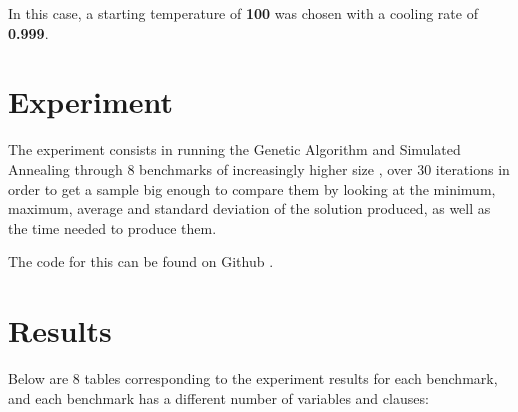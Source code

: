 \documentclass{article}
\begin{document}
In this case, a starting temperature of \textbf{100} was chosen with a
cooling rate of \textbf{0.999}.

\section{Experiment}
The experiment consists in running the Genetic Algorithm and Simulated
Annealing through 8 benchmarks of increasingly higher size \cite{benchmarks},
over 30 iterations in order to get a sample big enough to compare them by
looking at the minimum, maximum, average and standard deviation of the
solution produced, as well as the time needed to produce them.

The code for this can be found on Github \cite{github}.

\newpage

\section{Results}
Below are 8 tables corresponding to the experiment results for each benchmark,
and each benchmark has a different number of variables and clauses:
\end{document}
